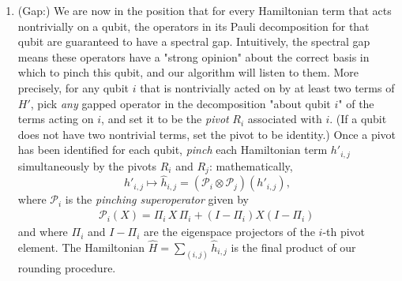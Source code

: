 \documentclass[11pt]{article}
\theoremstyle{plain}
\renewcommand{\cP}{\mathcal{P}}
\begin{document}
\begin{enumerate}
    \item (Gap:) We are now in the position that for every Hamiltonian term that acts nontrivially on a qubit, the operators in its Pauli decomposition for that qubit are guaranteed to have a spectral gap. Intuitively, the spectral gap means these operators have a "strong opinion" about the correct basis in which to pinch this qubit, and our algorithm will listen to them. More precisely, for any qubit $i$ that is nontrivially acted on by at least two terms of $H'$, pick \emph{any} gapped operator in the decomposition "about qubit $i$" of the terms acting on $i$, and set it to be the \emph{pivot} $R_i$ associated with $i$. (If a qubit does not have two nontrivial terms, set the pivot to be identity.) Once a pivot has been identified for each qubit, \emph{pinch} each Hamiltonian term $h'_{i,j}$ simultaneously by the pivots $R_i$ and $R_j$: mathematically,
    \[ h'_{i,j} \mapsto \hat{h}_{i,j} = (\cP_i \otimes \cP_j)(h'_{i,j}),\]
    where $\cP_i$ is the \emph{pinching superoperator} given by
 \begin{align}\label{eq:pinching-superoperator-overview}
    \mathcal{P}_i(X) = \Pi_i \, X \, \Pi_i + (I-\Pi_i) X (I-\Pi_i)\, 
    \end{align}
and where $\Pi_i$ and $I-\Pi_i$ are the eigenspace projectors of the $i$-th pivot element. The Hamiltonian $\hat{H} = \sum_{(i,j)} \hat{h}_{i,j}$ is the final product of our rounding procedure.


\end{enumerate}
\end{document}
